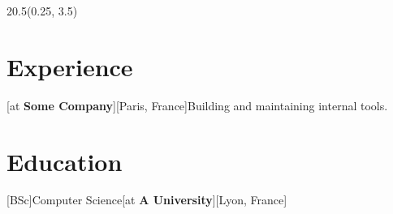 \documentclass[a4paper]{arthur-cv}
\begin{document}
  \makeprofile

  \begin{textblock}{20.5}(0.25, 3.5)

    \begin{minipage}[t]{0.37\textwidth}





    \end{minipage}\hfill\begin{minipage}[t]{0.61\textwidth}

      \section{Experience}
        \begin{rightenv}
          [at \textbf{Some Company}][Paris, France]{Building and maintaining internal tools.}
        \end{rightenv}

      \section{Education}
        \begin{rightenv}
          [BSc]{Computer Science}[at \textbf{A University}][Lyon, France]{}
        \end{rightenv}

    \end{minipage}

  \end{textblock}
\end{document}

